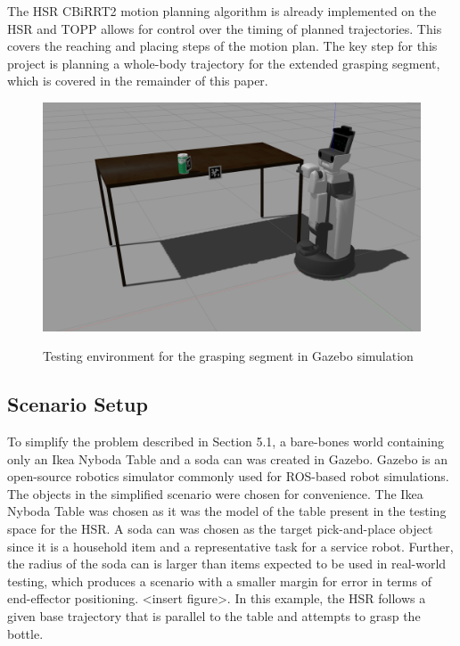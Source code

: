 \documentclass[11pt]{article}
\begin{document}
            The HSR CBiRRT2 motion planning algorithm is already implemented on the HSR and TOPP allows for control over the timing of planned trajectories. This covers the reaching and placing steps of the motion plan. The key step for this project is planning a whole-body trajectory for the extended grasping segment, which is covered in the remainder of this paper.
        
        \begin{figure}
            \centering
            \includegraphics[width=0.95\linewidth]{2020.05.19/setup.png}
            \label{fig:problem_setup}
            \caption{Testing environment for the grasping segment in Gazebo simulation}
        \end{figure}

        \subsection{Scenario Setup}
            To simplify the problem described in Section 5.1, a bare-bones world containing only an Ikea Nyboda Table and a soda can was created in Gazebo. Gazebo is an open-source robotics simulator commonly used for ROS-based robot simulations.\cite{koenig_design_2004} The objects in the simplified scenario were chosen for convenience. The Ikea Nyboda Table was chosen as it was the model of the table present in the testing space for the HSR. A soda can was chosen as the target pick-and-place object since it is a household item and a representative task for a service robot. Further, the radius of the soda can is larger than items expected to be used in real-world testing, which produces a scenario with a smaller margin for error in terms of end-effector positioning. <insert figure>. In this example, the HSR follows a given base trajectory that is parallel to the table and attempts to grasp the bottle.
            
\end{document}
